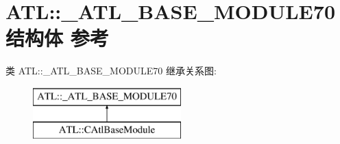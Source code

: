 \hypertarget{struct_a_t_l_1_1___a_t_l___b_a_s_e___m_o_d_u_l_e70}{}\section{A\+TL\+:\+:\+\_\+\+A\+T\+L\+\_\+\+B\+A\+S\+E\+\_\+\+M\+O\+D\+U\+L\+E70结构体 参考}
\label{struct_a_t_l_1_1___a_t_l___b_a_s_e___m_o_d_u_l_e70}
类 A\+TL\+:\+:\+\_\+\+A\+T\+L\+\_\+\+B\+A\+S\+E\+\_\+\+M\+O\+D\+U\+L\+E70 继承关系图\+:\begin{figure}[H]
\begin{center}
\leavevmode
\includegraphics[height=2.000000cm]{struct_a_t_l_1_1___a_t_l___b_a_s_e___m_o_d_u_l_e70}
\end{center}
\end{figure}
